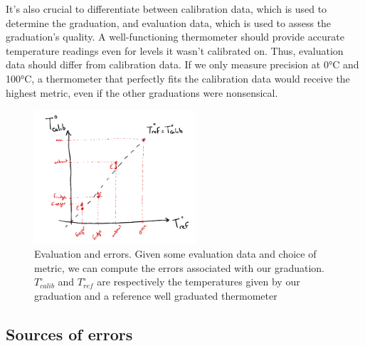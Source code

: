 \begin{bibunit}
It's also crucial to differentiate between calibration data, which is used to determine the graduation, and evaluation data, which is used to assess the graduation's quality.
A well-functioning thermometer should provide accurate temperature readings even for levels it wasn't calibrated on. Thus, evaluation data should differ from calibration data. If we only measure precision at 0°C and 100°C, a thermometer that perfectly fits the calibration data would receive the highest metric, even if the other graduations were nonsensical.

\begin{figure}
\includegraphics[clip, width=6cm]{Introduction/pics/errors.png}  
    \centering
    \caption{Evaluation and errors. Given some evaluation data and choice of metric, we can compute the errors associated with our graduation. $T^{\circ}_{calib}$ and $T^{\circ}_{ref}$ are respectively the temperatures given by our graduation and a reference well graduated thermometer}
    \label{fig:err_sources}
\end{figure}



 \subsection{Sources of errors}



\end{bibunit}
